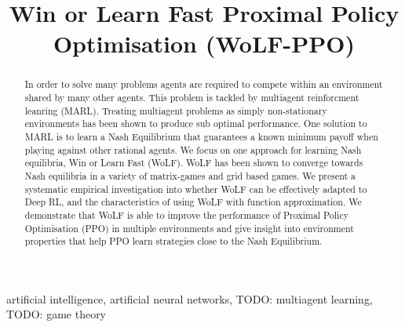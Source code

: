 \documentclass[conference]{IEEEtran}
\newcommand\TODO[1]{{\color{red}TODO: #1}}
\begin{document}
\title{Win or Learn Fast Proximal Policy Optimisation (WoLF-PPO)}

\author{
\and
{}
\and
{}
}

\maketitle

\begin{abstract}
    In order to solve many problems agents are required to compete within an environment shared by many other agents. This problem is tackled by multiagent reinforcment leanring (MARL). Treating multiagent problems as simply non-stationary environments has been shown to produce sub optimal performance. One solution to MARL is to learn a Nash Equilibrium that guarantees a known minimum payoff when playing against other rational agents. We focus on one approach for learning Nash equilibria, Win or Learn Fast (WoLF). WoLF has been shown to converge towards Nash equilibria in a variety of matrix-games and grid based games. We present a systematic empirical investigation into whether WoLF can be effectively adapted to Deep RL, and the characteristics of using WoLF with function approximation. We demonstrate that WoLF is able to improve the performance of Proximal Policy Optimisation (PPO) in multiple environments and give insight into environment properties that help PPO learn strategies close to the Nash Equilibrium.
\end{abstract}

\begin{IEEEkeywords}
    artificial intelligence, artificial neural networks, \TODO{multiagent learning}, \TODO{game theory}
\end{IEEEkeywords}
\end{document}
